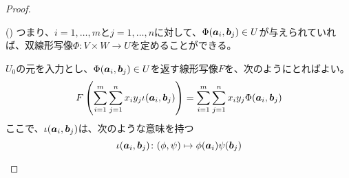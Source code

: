 \documentclass[../../../topic_linear-algebra]{subfiles}
\begin{document}
\begin{proof}
\begin{subpattern}{()}
    つまり、$i = 1, \ldots, m$と$j = 1, \ldots, n$に対して、$\Phi(\vb*{a}_i, \vb*{b}_j) \in U$が与えられていれば、双線形写像$\Phi\colon V \times W \to U$を定めることができる。

    \br
  
    $U_0$の元を入力とし、$\Phi(\vb*{a}_i, \vb*{b}_j) \in U$を返す線形写像$F$を、次のようにとればよい。
    \begin{equation*}
      F\left(\sum_{i=1}^m \sum_{j=1}^n x_i y_j \iota(\vb*{a}_i, \vb*{b}_j)\right) = \sum_{i=1}^m \sum_{j=1}^n x_i y_j \Phi(\vb*{a}_i, \vb*{b}_j)
    \end{equation*}
    ここで、$\iota(\vb*{a}_i, \vb*{b}_j)$は、次のような意味を持つ
    \begin{equation*}
      \iota(\vb*{a}_i, \vb*{b}_j) \colon (\phi, \psi) \mapsto \phi(\vb*{a}_i) \psi(\vb*{b}_j)
    \end{equation*}
  \end{subpattern}
\end{proof}
\end{document}
